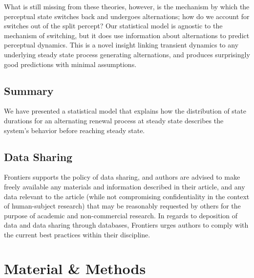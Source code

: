 What is still missing from these theories, however, is the mechanism by which the perceptual state switches back and undergoes alternations; how do we account for switches out of the split percept? Our statistical model is agnostic to the mechanism of switching, but it does use information about alternations to predict perceptual dynamics. This is a novel insight linking transient dynamics to any underlying steady state process generating alternations, and produces surprisingly good predictions with minimal assumptions.




\subsection{Summary}
We have presented a statistical model that explains how the distribution of state durations for an alternating renewal process at steady state describes the system's behavior before reaching steady state. 

\subsection{Data Sharing}

Frontiers supports the policy of data sharing, and authors are advised to make freely available any materials and information described in their article, and any data relevant to the article (while not compromising confidentiality in the context of human-subject research) that may be reasonably requested by others for the purpose of academic and non-commercial research. In regards to deposition of data and data sharing through databases, Frontiers urges authors to comply with the current best practices within their discipline.

\section{Material \& Methods}

